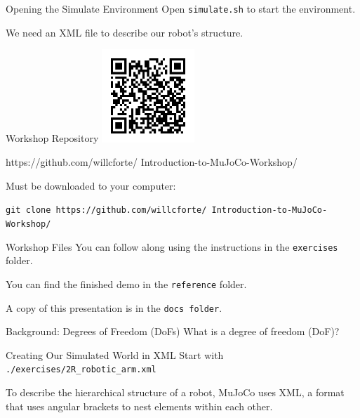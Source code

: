 \documentclass[14pt]{beamer}
\begin{document}
	\begin{frame}{Opening the Simulate Environment}
		Open \texttt{simulate.sh} to start the environment.
		
		\vspace{1cm}
		
		We need an XML file to describe our robot's structure.
	\end{frame}
	
	\begin{frame}{Workshop Repository}
		\includegraphics[width=3.5cm,trim={0.5cm 0.5cm 0.5cm 0.5cm},clip]{workshop_qr.png}
		
		\vspace{0.2cm}
		
		https://github.com/willcforte/ Introduction-to-MuJoCo-Workshop/
		
		\vspace{0.2cm}
		
		Must be downloaded to your computer:
	
		\texttt{git clone https://github.com/willcforte/ Introduction-to-MuJoCo-Workshop/}
	\end{frame}
	
	\begin{frame}{Workshop Files}
		You can follow along using the instructions in the \texttt{exercises} folder.
		
		You can find the finished demo in the \texttt{reference} folder.
		
		A copy of this presentation is in the \texttt{docs folder}.
		
	\end{frame}
	
	\begin{frame}{Background: Degrees of Freedom (DoFs)}
		What is a degree of freedom (DoF)?
	\end{frame}
	
	\begin{frame}{Creating Our Simulated World in XML}
		Start with \texttt{./exercises/2R\_robotic\_arm.xml}
		
		To describe the hierarchical structure of a robot, MuJoCo uses XML, a format that uses angular brackets to nest elements within each other.
	\end{frame}
	
\end{document}
